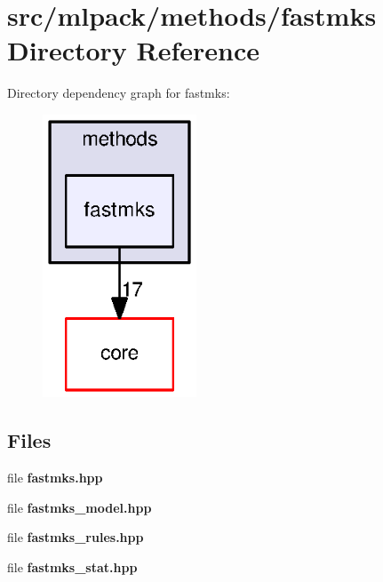 \section{src/mlpack/methods/fastmks Directory Reference}
\label{dir_4660db6ad81c659834e5c7f254d158da}
Directory dependency graph for fastmks\+:
\nopagebreak
\begin{figure}[H]
\begin{center}
\leavevmode
\includegraphics[width=130pt]{dir_4660db6ad81c659834e5c7f254d158da_dep}
\end{center}
\end{figure}
\subsection*{Files}
\begin{DoxyCompactItemize}
\item 
file {\bf fastmks.\+hpp}
\item 
file {\bf fastmks\+\_\+model.\+hpp}
\item 
file {\bf fastmks\+\_\+rules.\+hpp}
\item 
file {\bf fastmks\+\_\+stat.\+hpp}
\end{DoxyCompactItemize}
